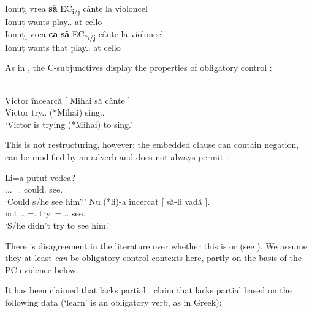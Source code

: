 \documentclass[output=paper]{langsci/langscibook}
\begin{document}
\ea%
    \label{ex:key:24.23}
	\ea
		\gll Ionuț\textsubscript{i} vrea     \textbf{sǎ} EC\textsubscript{i/j} cânte     la violoncel\\
        Ionuț  wants     \Sbjv{}   {}  play.\Sbjv{}.\Tsg{}  at cello\\
	\ex	\gll Ionuț\textsubscript{i}  vrea   \textbf{ca} \textbf{sǎ}   EC\textsubscript{*i/j} cânte     la violoncel\\
        Ionuț  wants   that   \Sbjv{}  {}   play.\Sbjv{}.\Tsg{}  at cello\\
	\z
\z

As in , the C-subjunctives display the properties of obligatory
control
\parencite{Landau2004,Alboiu2007,AlexiadouEtAl2010,Hill2012,Nicolae2013}:

\ea%
    \label{ex:key:24.24}\\
	\gll \llap{*}Victor încearcă     [ Mihai     să   cânte ]\\
        Victor try.\Prs.\Tsg{} {} (*Mihai) \Sbjv{} sing.\Sbjv.\Tsg{}\\
    \glt ‘Victor is trying (*Mihai) to sing.’
\z

This is not restructuring, however: the embedded clause can contain negation,
can be modified by an adverb and does not always permit 
\parencite{Alboiu2007,AlexiadouEtAl2010}:

\ea%
    \label{ex:key:24.25} \citep[8]{Alboiu2007}
	\ea
		\gll Li=a         putut     vedea?\\
        \Cl{}.\Tsg.\M.\Acc{}=\Aux.\Tsg{}   could.\Ptcp{}   see.\Tsg{}\\
		\glt ‘Could s/he see him?’
	\ex
		\gll Nu (*li)-a             încercat    [ să-li       vadă ].\\
        not \hphantom{(*}\Cl.\Tsg.\M.\Acc{}=\Aux.\Tsg{} try.\Ptcp{} {} \Sbjv=\Cl.\Tsg.\M.\Acc{} see.\Tsg\\
		\glt ‘S/he didn’t try to see him.’
	\z
\z

There is disagreement in the literature over whether this is  or 
(see \citealt{Nicolae2013}). We assume they at least \emph{can} be obligatory
control contexts here, partly on the basis of the \gls{PC} evidence below.

It has been claimed that  lacks partial .
\citet{AlexiadouEtAl2010} claim that  lacks partial  based on
the following data (‘learn’ is an obligatory  verb, as in Greek):
\end{document}
